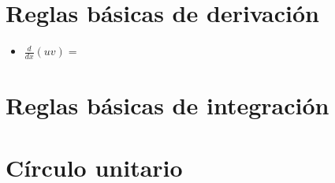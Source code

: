 \documentclass[twoside,letterpaper,twocolumn,12pt]{book}
\begin{document}
\pagestyle{empty} %

\section*{Reglas básicas de derivación}

\begin{itemize}
    \item $\frac{d}{dx}(uv)=  $
\end{itemize}

\newpage
\section*{Reglas básicas de integración}

\section*{Círculo unitario}
\end{document}
